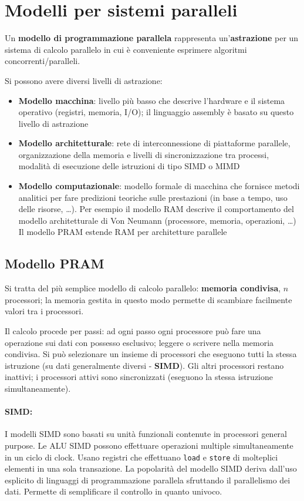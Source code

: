 \section{Modelli per sistemi paralleli}
Un \textbf{modello di programmazione parallela} rappresenta un'\textbf{astrazione} per un sistema di calcolo parallelo in cui è conveniente esprimere algoritmi concorrenti/paralleli.

Si possono avere diversi livelli di astrazione: 
\begin{itemize}
	\item \textbf{Modello macchina}: livello più basso che descrive l'hardware e il sistema operativo (registri, memoria, I/O); il linguaggio assembly è basato su questo livello di astrazione
	
	\item \textbf{Modello architetturale}: rete di interconnessione di piattaforme parallele, organizzazione della memoria e livelli di sincronizzazione tra processi, modalità di esecuzione delle istruzioni di tipo SIMD o MIMD
	
	\item \textbf{Modello computazionale}: modello formale di macchina che fornisce metodi analitici per fare predizioni teoriche sulle prestazioni (in base a tempo, uso delle risorse, \dots). Per esempio il modello RAM descrive il comportamento del modello architetturale di Von Neumann (processore, memoria, operazioni, \dots) Il modello PRAM estende RAM per architetture parallele
\end{itemize}

\subsection{Modello PRAM}
Si tratta del più semplice modello di calcolo parallelo: \textbf{memoria condivisa}, $n$ processori; la memoria gestita in questo modo permette di scambiare facilmente valori tra i processori.

Il calcolo procede per passi: ad ogni passo ogni processore può fare una operazione sui dati con possesso esclusivo; leggere o scrivere nella memoria condivisa. Si può selezionare un insieme di processori che eseguono tutti la stessa istruzione (su dati generalmente diversi - \textbf{SIMD}). Gli altri processori restano inattivi; i processori attivi sono sincronizzati (eseguono la stessa istruzione simultaneamente).

\paragraph{SIMD:} I modelli SIMD sono basati su unità funzionali contenute in processori general purpose. Le ALU SIMD possono effettuare operazioni multiple simultaneamente in un ciclo di clock. Usano registri che effettuano \texttt{load} e \texttt{store} di molteplici elementi in una sola transazione. La popolarità del modello SIMD deriva dall'uso esplicito di linguaggi di programmazione parallela sfruttando il parallelismo dei dati. Permette di semplificare il controllo in quanto univoco.

